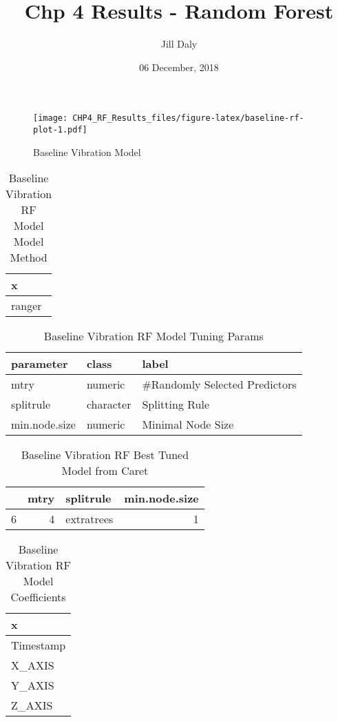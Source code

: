 \documentclass[]{article}
\title{Chp 4 Results - Random Forest}
\author{Jill Daly}
\date{06 December, 2018}
\begin{document}
\maketitle

\begin{figure}
\centering
\texttt{[image: CHP4\_RF\_Results\_files/figure-latex/baseline-rf-plot-1.pdf]}
\caption{Baseline Vibration Model}
\end{figure}

\begin{table}[!h]

\caption{\label{tab:baseline-rf-params}Baseline Vibration RF Model Model Method}
\centering
\begin{tabular}[t]{l}
\toprule
x\\
\midrule
ranger\\
\bottomrule
\end{tabular}
\end{table}

\begin{table}[!h]

\caption{\label{tab:baseline-rf-params}Baseline Vibration RF Model Tuning Params}
\centering
\begin{tabular}[t]{lll}
\toprule
parameter & class & label\\
\midrule
mtry & numeric & \#Randomly Selected Predictors\\
splitrule & character & Splitting Rule\\
min.node.size & numeric & Minimal Node Size\\
\bottomrule
\end{tabular}
\end{table}

\begin{table}[!h]

\caption{\label{tab:baseline-rf-params}Baseline Vibration RF Best Tuned Model from Caret}
\centering
\begin{tabular}[t]{lrlr}
\toprule
  & mtry & splitrule & min.node.size\\
\midrule
6 & 4 & extratrees & 1\\
\bottomrule
\end{tabular}
\end{table}

\begin{table}[!h]

\caption{\label{tab:baseline-rf-params}Baseline Vibration RF Model Coefficients}
\centering
\begin{tabular}[t]{l}
\toprule
x\\
\midrule
Timestamp\\
X\_AXIS\\
Y\_AXIS\\
Z\_AXIS\\
\bottomrule
\end{tabular}
\end{table}
\end{document}
